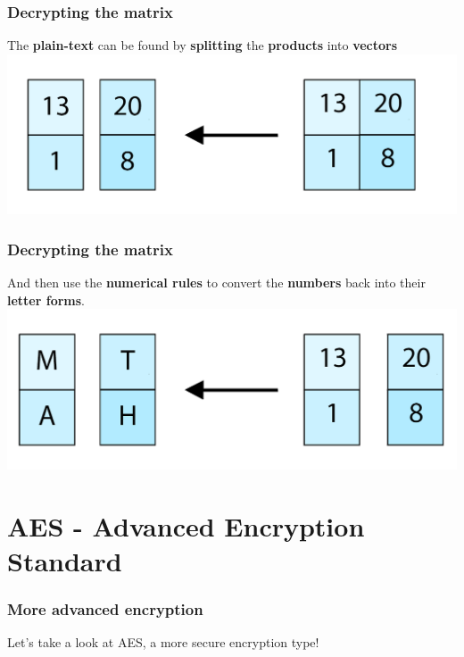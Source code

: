 \documentclass[11pt]{beamer}
\begin{document}
\begin{frame}\frametitle{Decrypting the matrix}

The \textbf{plain-text} can be found by \textbf{splitting} the \textbf{products} into \textbf{vectors}
\center \includegraphics[scale=0.2]{linear_2}

\end{frame}

\begin{frame}\frametitle{Decrypting the matrix}

And then use the \textbf{numerical rules} to convert the \textbf{numbers} back into their \textbf{letter forms}.
\center \includegraphics[scale=0.2]{math_2}

\end{frame}

\section{AES - Advanced Encryption Standard}
\begin{frame}\frametitle{More advanced encryption}
\center Let's take a look at AES, a more secure encryption type!
\end{frame}
\end{document}
